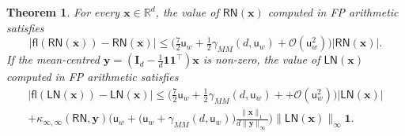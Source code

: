 \documentclass[namedate,webpdf,imanum]{ima-authoring-template}
\newcommand{\Real}{\mathbb{R}}
\newcommand{\Matrix}[1]{\mathbf{#1}}
\newcommand{\trans}{\intercal}
\newcommand{\Norm}[3][]{#1\| #2 #1\|_{\mathrm{#3}}}
\newcommand{\One}{\Matrix{1}}
\newcommand{\Layer}[1]{\mathsf{#1}}
\newcommand{\cond}[3][]{\kappa_{\mathrm{#2}} #1( #3 #1)}
\newcommand{\fl}[2][]{\mathsf{fl}#1( #2 #1)}
\newcommand{\uh}{\mathsf{u}}
\newcommand{\Oh}[2][]{\mathcal{O}#1( #2 #1)}
\newtheorem{theorem}{Theorem}[section]%
\numberwithin{equation}{section}
\begin{document}
\begin{theorem}
\label{theorem:rounding-both-layernorm}
For every $\Matrix{x} \in \Real^d$, the value of $\Layer{RN}(\Matrix{x})$ computed in FP arithmetic satisfies
\begin{equation*}
    | \fl{\Layer{RN}(\Matrix{x})} - \Layer{RN}(\Matrix{x}) | \leq \Big( \tfrac{7}{2} \uh_{w} + \tfrac{1}{2} \gamma_{MM}(d, \uh_w) + \Oh{\uh_{w}^2} \Big) |\Layer{RN}(\Matrix{x})|.
\end{equation*}
If the mean-centred $\Matrix{y} = (\Matrix{I}_d - \tfrac{1}{d} \One \One^\trans) \Matrix{x}$ is non-zero, the value of $\Layer{LN}(\Matrix{x})$ computed in FP arithmetic satisfies
\begin{multline*}
    | \fl{\Layer{LN}(\Matrix{x})} - \Layer{LN}(\Matrix{x}) | \leq \Big(\tfrac{7}{2} \uh_{w} + \tfrac{1}{2} \gamma_{MM}(d, \uh_w) + + \Oh{\uh_w^2} \Big) |\Layer{LN}(\Matrix{x})| \\
    + \cond{\infty,\infty}{\Layer{RN},\Matrix{y}} \bigg( \uh_{w} + \Big(\uh_{w} + \gamma_{MM}(d, \uh_w)\Big) \frac{\Norm{\Matrix{x}}{1}}{d \Norm{\Matrix{y}}{\infty}} \bigg) \Norm{\Layer{LN}(\Matrix{x})}{\infty} \One.
\end{multline*}
\end{theorem}
\end{document}
